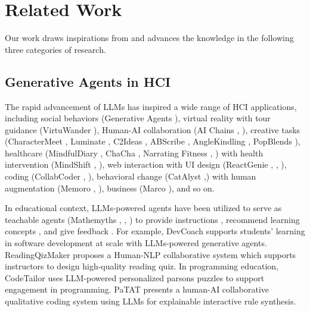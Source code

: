 \section{Related Work}
\label{sec:related}



Our work draws inspirations from and advances the knowledge in the following three categories of research.


\subsection{Generative Agents in HCI}


The rapid advancement of LLMs has inspired a wide range of HCI applications, including social behaviors (Generative Agents \cite{park2023generative}), virtual reality \cite{wan2024building} with tour guidance (VirtuWander \cite{wang2024virtuwander}), Human-AI collaboration (AI Chains \cite{wu2022ai}, \cite{wang2024human}), creative tasks (CharacterMeet \cite{qin2024charactermeet}, Luminate \cite{suh2024luminate}, C2Ideas \cite{hou2024c2ideas}, ABScribe \cite{reza2024abscribe}, AngleKindling \cite{petridis2023anglekindling}, PopBlends \cite{wang2023popblends}), healthcare (MindfulDiary \cite{kim2024mindfuldiary}, ChaCha \cite{seo2024chacha}, Narrating Fitness \cite{stromel2024narrating}, \cite{rajashekar2024human}) with health intervention (MindShift \cite{wu2024mindshift}, \cite{jo2024understanding, jo2023understanding, calle2024towards, ma2024evaluating}), web interaction \cite{deng2024large} with UI design (ReactGenie \cite{yang2024reactgenie}, \cite{duan2024generating}, \cite{wang2023enabling}), coding (CollabCoder \cite{gao2024collabcoder}, \cite{liu2023wants}), behavioral change (CatAlyst \cite{arakawa2023catalyst},\cite{bhattacharjee2024understanding}) with human augmentation (Memoro \cite{zulfikar2024memoro}, \cite{jang2024s}), business (Marco \cite{fok2024marco}), and so on.


In educational context, LLMs-powered agents have been utilized to serve as teachable agents (Mathemyths \cite{zhang2024mathemyths}, \cite{jin2024teach}, \cite{liang2023let}) to provide instructions \cite{vadaparty2024cs1}, recommend learning concepts \cite{li2024learning}, and give feedback \cite{matelsky2023large}. For example, DevCoach \cite{wang2024devcoach} supports students' learning in software development at scale with LLMs-powered generative agents. ReadingQizMaker \cite{lu2023readingquizmaker} proposes a Human-NLP collaborative system which supports instructors to design high-quality reading quiz. In programming education, CodeTailor \cite{hou2024codetailor} uses LLM-powered personalized parsons puzzles to support engagement in programming. PaTAT \cite{gebreegziabher2023patat} presents a human-AI collaborative qualitative coding system using LLMs for explainable interactive rule synthesis. 


